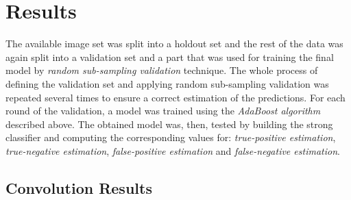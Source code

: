 \documentclass[11pt,twocolumn]{article}
\begin{document}
	\section{Results}\label{sec:results}
		The available image set was split into a holdout set and the
		rest of the data was again split into a validation set and a part that was
		used for training the final model by \emph{random sub-sampling
		validation} technique. The whole process of defining the validation set
		and applying random sub-sampling validation was repeated several times
		to ensure a correct estimation of the predictions. For each round of the
		validation, a model was trained using the \emph{AdaBoost algorithm}
		described above. The obtained model was, then, tested by building the strong
		classifier and computing the corresponding values for: \emph{true-positive
		estimation}, \emph{true-negative estimation}, \emph{false-positive estimation}
		and \emph{false-negative estimation}.\\
		\subsection{Convolution Results}\label{sec:haar_results}
\end{document}
